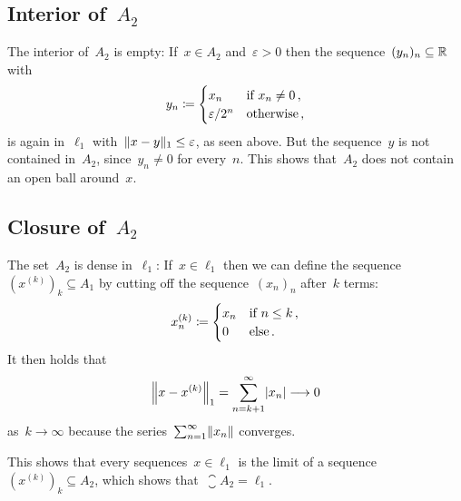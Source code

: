 \subsection*{Interior of~$A_2$}

The interior of~$A_2$ is empty:
If~$x \in A_2$ and~$\varepsilon > 0$ then the sequence~$(y_n)_n \subseteq \Real$ with
\[
            y_n
  \defined  \begin{cases}
              x_n             & \text{if~$x_n \neq 0$} \,,  \\
              \varepsilon/2^n & \text{otherwise} \,,
            \end{cases}
\]
is again in~$\ell_1$ with~$\norm{ x - y }_1 \leq \varepsilon$, as seen above.
But the sequence~$y$ is not contained in~$A_2$, since~$y_n \neq 0$ for every~$n$.
This shows that~$A_2$ does not contain an open ball around~$x$.





\subsection*{Closure of~$A_2$}

The set~$A_2$ is dense in~$\ell_1$:
If~$x \in \ell_1$ then we can define the sequence~$(x^{(k)})_k \subseteq A_1$ by cutting off the sequence~$(x_n)_n$ after~$k$ terms:
\[
            x^{(k)}_n
  \defined  \begin{cases}
              x_n & \text{if $n \leq k$} \,,  \\
              0   & \text{else} \,.
            \end{cases}
\]
It then holds that
\[
          \norm*{ x - x^{(k)} }_1
  =       \sum_{n={k+1}}^\infty \abs{x_n}
  \longto  0
\]
as~$k \to \infty$ because the series~$\sum_{n=1}^\infty \norm*{x_n}$ converges.

This shows that every sequences~$x \in \ell_1$ is the limit of a sequence~$(x^{(k)})_k \subseteq A_2$, which shows that~$\closure{A_2} = \ell_1$.




